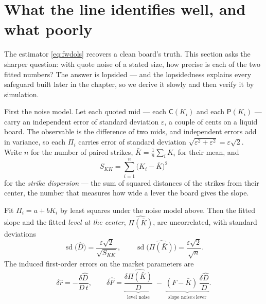 \section{What the line identifies well, and what poorly}
\label{sec:fwdident}

The estimator \eqref{eq:fwdols} recovers a clean board's truth.  This
section asks the sharper question: with quote noise of a stated size,
how precise is each of the two fitted numbers?  The answer is lopsided
--- and the lopsidedness explains every safeguard built later in the
chapter, so we derive it slowly and then verify it by simulation.

First the noise model.  Let each quoted mid --- each
$\mathsf{C}(K_i)$ and each $\mathsf{P}(K_i)$ --- carry an independent
error of standard deviation $\varepsilon$, a couple of cents on a liquid
board.  The observable is the difference of two mids, and independent
errors add in variance, so each $\Pi_i$ carries error of standard
deviation $\sqrt{\varepsilon^2+\varepsilon^2}=\varepsilon\sqrt2$.  Write $n$ for the number
of paired strikes, $\bar K=\frac1n\sum_iK_i$ for their mean, and
\[
S_{KK}=\sum_{i=1}^n\big(K_i-\bar K\big)^2
\]
for the \emph{strike dispersion} --- the sum of squared distances of
the strikes from their center, the number that measures how wide a
lever the board gives the slope.

\begin{proposition}
\label{prop:fwdols}
Fit $\Pi_i=a+bK_i$ by least squares under the noise model above.
Then the fitted slope and the fitted \emph{level at the center},
$\widehat{\Pi(\bar K)}$, are uncorrelated, with standard deviations
\begin{equation}
\operatorname{sd}\big(\hat D\big)
=\frac{\varepsilon\sqrt2}{\sqrt{S_{KK}}},
\qquad
\operatorname{sd}\big(\widehat{\Pi(\bar K)}\big)
=\frac{\varepsilon\sqrt2}{\sqrt n}.
\label{eq:fwdolssd}
\end{equation}
The induced first-order errors on the market parameters are
\begin{equation}
\delta\hat r=-\frac{\delta\hat D}{D\,t},
\qquad
\delta\hat F
=\underbrace{\frac{\delta\widehat{\Pi(\bar K)}}{D}}_{\text{level
noise}}
\;-\;\underbrace{(F-\bar K)\,\frac{\delta\hat D}{D}}_{\text{slope
noise}\times\text{lever}} .
\label{eq:fwddecomp}
\end{equation}
\end{proposition}

